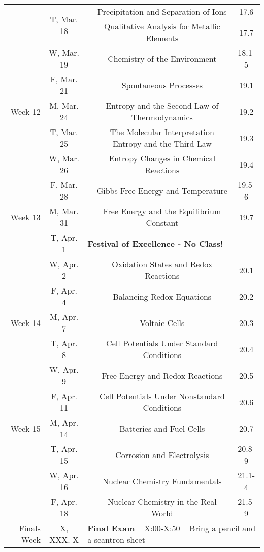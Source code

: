 \begin{tabular}{rcccc}
& \multirow{2}{*}{T, Mar. 18}& & Precipitation and Separation of Ions & 17.6\\
& & & Qualitative Analysis for Metallic Elements & 17.7\\
& W, Mar. 19&& Chemistry of the Environment & 18.1-5\\
& F, Mar. 21&& Spontaneous Processes & 19.1\\
\midrule
Week 12 & M, Mar. 24&& Entropy and the Second Law of Thermodynamics & 19.2\\
& T, Mar. 25&& The Molecular Interpretation Entropy and the Third Law & 19.3\\
& W, Mar. 26&& Entropy Changes in Chemical Reactions & 19.4\\
& F, Mar. 28&& Gibbs Free Energy and Temperature & 19.5-6\\
\midrule
Week 13 & M, Mar. 31&& Free Energy and the Equilibrium Constant & 19.7\\
& T, Apr. 1& \multicolumn{3}{l}{\textbf{Festival of Excellence - No Class!}}\\
& W, Apr. 2&& Oxidation States and Redox Reactions & 20.1\\
& F, Apr. 4&& Balancing Redox Equations & 20.2\\
\midrule
Week 14 & M, Apr. 7&& Voltaic Cells & 20.3\\
& T, Apr. 8&& Cell Potentials Under Standard Conditions & 20.4\\
& W, Apr. 9&& Free Energy and Redox Reactions & 20.5\\
& F, Apr. 11&& Cell Potentials Under Nonstandard Conditions & 20.6\\
\midrule
Week 15 & M, Apr. 14&& Batteries and Fuel Cells & 20.7\\
& T, Apr. 15&& Corrosion and Electrolysis & 20.8-9\\
& W, Apr. 16&& Nuclear Chemistry Fundamentals & 21.1-4\\
& F, Apr. 18&& Nuclear Chemistry in the Real World & 21.5-9\\
\midrule
\midrule
Finals Week & X, XXX. X & \multicolumn{3}{l}{\textbf{Final Exam} ~ X:00-X:50 ~ Bring a pencil and a scantron sheet}\\
\end{tabular}